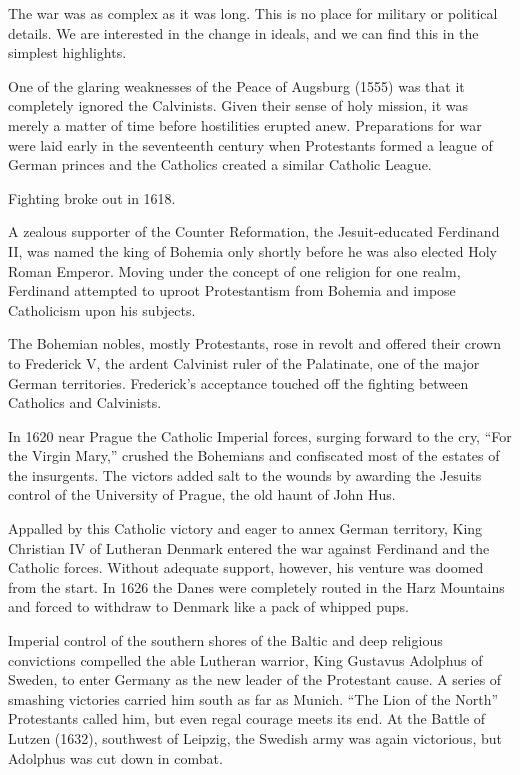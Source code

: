 The war was as complex as it was long. This is no place for military or political details. We are
interested in the change in ideals, and we can find this in the simplest highlights.

One of the glaring weaknesses of the Peace of Augsburg (1555) was that it completely ignored the
Calvinists. Given their sense of holy mission, it was merely a matter of time before hostilities
erupted anew. Preparations for war were laid early in the seventeenth century when Protestants
formed a league of German princes and the Catholics created a similar Catholic League.

Fighting broke out in 1618.

A zealous supporter of the Counter Reformation, the Jesuit-educated Ferdinand II, was named the king
of Bohemia only shortly before he was also elected Holy Roman Emperor. Moving under the concept of
one religion for one realm, Ferdinand attempted to uproot Protestantism from Bohemia and impose
Catholicism upon his subjects.

The Bohemian nobles, mostly Protestants, rose in revolt and offered their crown to Frederick V, the
ardent Calvinist ruler of the Palatinate, one of the major German territories. Frederick’s
acceptance touched off the fighting between Catholics and Calvinists.

In 1620 near Prague the Catholic Imperial forces, surging forward to the cry, “For the Virgin Mary,”
crushed the Bohemians and confiscated most of the estates of the insurgents. The victors added salt
to the wounds by awarding the Jesuits control of the University of Prague, the old haunt of John
Hus.

Appalled by this Catholic victory and eager to annex German territory, King Christian IV of Lutheran
Denmark entered the war against Ferdinand and the Catholic forces. Without adequate support,
however, his venture was doomed from the start. In 1626 the Danes were completely routed in the Harz
Mountains and forced to withdraw to Denmark like a pack of whipped pups.

Imperial control of the southern shores of the Baltic and deep religious convictions compelled the
able Lutheran warrior, King Gustavus Adolphus of Sweden, to enter Germany as the new leader of the
Protestant cause. A series of smashing victories carried him south as far as Munich. “The Lion of
the North” Protestants called him, but even regal courage meets its end. At the Battle of Lutzen
(1632), southwest of Leipzig, the Swedish army was again victorious, but Adolphus was cut down in
combat.

